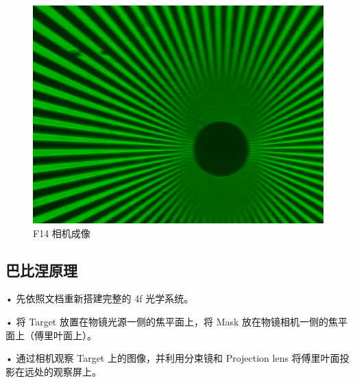 \documentclass{ctexart}
\begin{document}
\begin{figure}[H]
\begin{minipage}[b]{0.3\textwidth}
    \includegraphics[width=\textwidth]{pictures/F14-mask-Ex23.png}
    \caption{F14 相机成像}
  \end{minipage}
\end{figure}

\subsection{巴比涅原理}
• 先依照文档重新搭建完整的 4f 光学系统。

• 将 Target 放置在物镜光源一侧的焦平面上，将 Mask 放在物镜相机一侧的焦平面上（傅里叶面上）。

• 通过相机观察 Target 上的图像，并利用分束镜和 Projection lens 将傅里叶面投影在远处的观察屏上。
\end{document}
